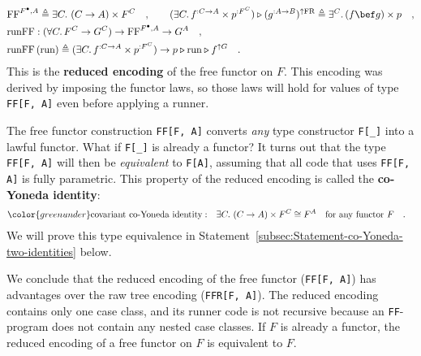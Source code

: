\begin{align*}
 & \text{FF}^{F^{\bullet},A}\triangleq\exists C.\,\left(C\rightarrow A\right)\times F^{C}\quad,\quad\quad(\exists C.\,f^{:C\rightarrow A}\times p^{:F^{C}})\triangleright(g^{:A\rightarrow B})^{\uparrow\text{FR}}\triangleq\exists^{C}.\,(f\bef g)\times p\quad,\\
 & \text{runFF}:(\forall C.\,F^{C}\rightarrow G^{C})\rightarrow\text{FF}^{F^{\bullet},A}\rightarrow G^{A}\quad,\\
 & \text{runFF}\,(\text{run})\triangleq(\exists C.\,f^{:C\rightarrow A}\times p^{:F^{C}})\rightarrow p\triangleright\text{run}\triangleright f^{\uparrow G}\quad.
\end{align*}
This is the \textbf{reduced encoding}
of the free functor on $F$. This encoding was derived by imposing
the functor laws, so those laws will hold for values of type \lstinline!FF[F, A]!
even before applying a runner.

The free functor construction \lstinline!FF[F, A]!
converts \emph{any} type constructor \lstinline!F[_]!
into a lawful functor. What if \lstinline!F[_]!
is already a functor? It turns out that the type \lstinline!FF[F, A]!
will then be \emph{equivalent} to \lstinline!F[A]!,
assuming that all code that uses \lstinline!FF[F, A]!
is fully parametric. This property of the reduced encoding is called
the \textbf{co-Yoneda identity}:
\begin{align*}
{\color{greenunder}\text{covariant co-Yoneda identity}:}\quad & \exists C.\,\left(C\rightarrow A\right)\times F^{C}\cong F^{A}\quad\text{for any functor }F\quad.
\end{align*}
We will prove this type equivalence in Statement~\ref{subsec:Statement-co-Yoneda-two-identities}
below. 

We conclude that the reduced encoding of the free functor (\lstinline!FF[F, A]!)
has advantages over the raw tree encoding (\lstinline!FFR[F, A]!).
The reduced encoding contains only one case class, and its runner
code is not recursive because an \lstinline!FF!-program
does not contain any nested case classes. If $F$ is already a functor,
the reduced encoding of a free functor on $F$ is equivalent to $F$.

